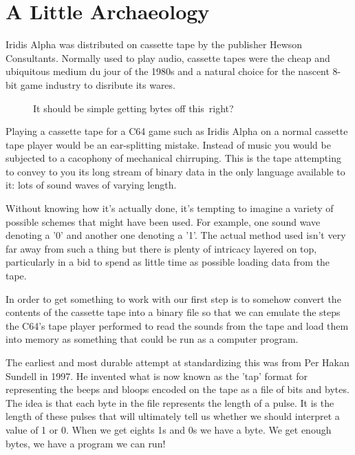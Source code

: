 \chapter{A Little Archaeology} 
\label{sec:archaeo}
\lstset{style=6502Style}

Iridis Alpha was distributed on cassette tape by the publisher Hewson Consultants. Normally used
to play audio, cassette tapes were the cheap and ubiquitous medium du jour of the 1980s and a
natural choice for the nascent 8-bit game industry to disribute its wares.

\begin{figure}[H]
  {
    \begin{adjustbox}{width=10cm,center}
    \end{adjustbox}
  }\caption[]{It should be simple getting bytes off this\, right?}
\end{figure}

Playing a cassette tape for a C64 game such as Iridis Alpha on a normal cassette tape player would
be an ear-splitting mistake. Instead of music you would be subjected to a cacophony of mechanical
chirruping. This is the tape attempting to convey to you its long stream of binary data in the only
language available to it: lots of sound waves of varying length.

Without knowing how it's actually done, it's tempting to imagine a variety of possible schemes that
might have been used. For example, one sound wave denoting a '0' and another one denoting a '1'.
The actual method used isn't very far away from such a thing but there is plenty of intricacy
layered on top, particularly in a bid to spend as little time as possible loading data from the
tape.

In order to get something to work with our first step is to somehow convert the contents of the
cassette tape into a binary file so that we can emulate the steps the C64's tape player performed
to read the sounds from the tape and load them into memory as something that could be run as a
computer program.

The earliest and most durable attempt at standardizing this was from Per Hakan Sundell in 1997. He
invented what is now known as the 'tap' format for representing the beeps and bloops encoded on the
tape as a file of bits and bytes. The idea is that each byte in the file represents the length of
a pulse. It is the length of these pulses that will ultimately tell us whether we should interpret
a value of 1 or 0. When we get eights 1s and 0s we have a byte. We get enough bytes, we have a program
we can run!

